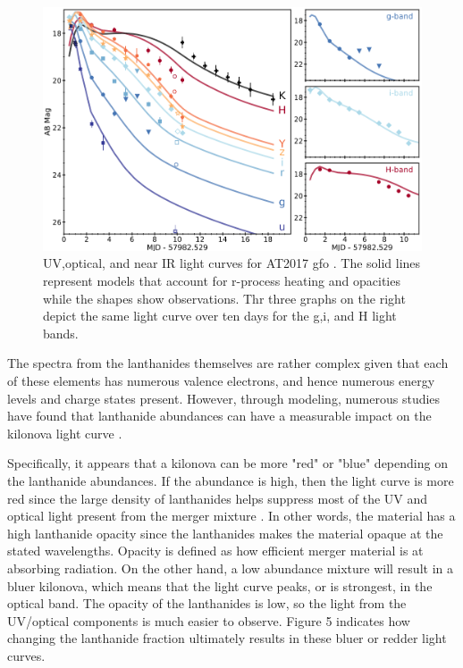 \documentclass[11pt,a4paper]{article}
\begin{document}
\begin{figure}[h!]
  \includegraphics[width=1\textwidth]{light_curve.png}
  \caption{UV,optical, and near IR light curves for AT2017 gfo \cite{Nicholl_2017} . The solid lines represent models that account for r-process heating and opacities while the shapes show observations. Thr three graphs on the right depict the same light curve over ten days for the g,i, and H light bands. }
\end{figure}

The spectra from the lanthanides themselves are rather complex given that each of these elements has numerous valence electrons, and hence numerous energy levels and charge states present. However, through modeling, numerous studies have found that lanthanide abundances can have a measurable impact on the kilonova light curve \cite{Barnes_Kasen_2013} \cite{Metzger_2014} .

Specifically, it appears that a kilonova can be more "red" or "blue" depending on the lanthanide abundances. If the abundance is high, then the light curve is more red since the large density of lanthanides helps suppress most of the UV and optical light present from the merger mixture \cite{Metzger_2019} . In other words, the material has a high lanthanide opacity since the lanthanides makes the material opaque at the stated wavelengths. Opacity is defined as how efficient merger material is at absorbing radiation. On the other hand, a low abundance mixture will result in a bluer kilonova, which means that the light curve peaks, or is strongest, in the optical band. The opacity of the lanthanides is low, so the light from the UV/optical components is much easier to observe. Figure 5 indicates how changing the lanthanide fraction ultimately results in these bluer or redder light curves. 
\end{document}
